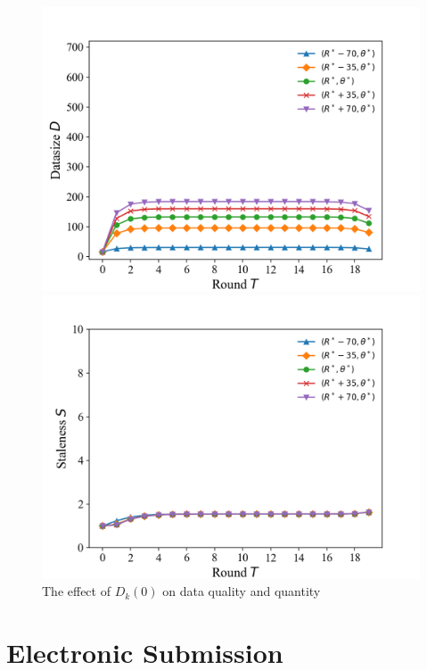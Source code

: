 \documentclass{article}
\theoremstyle{plain}
\theoremstyle{definition}
\theoremstyle{remark}
\begin{document}
\begin{figure}
\begin{minipage}{0.33\linewidth}
		\centerline{\includegraphics[width=\textwidth]{figures/figure_59_B.png}}
	\end{minipage}
  \begin{minipage}{0.33\linewidth}
		\vspace{3pt}
		\centerline{\includegraphics[width=\textwidth]{figures/figure_59_C.png}}
	\end{minipage}  
	\caption{The effect of $D_k(0)$ on data quality and quantity}
\end{figure}


\section{Electronic Submission}
\label{submission}
\end{document}
